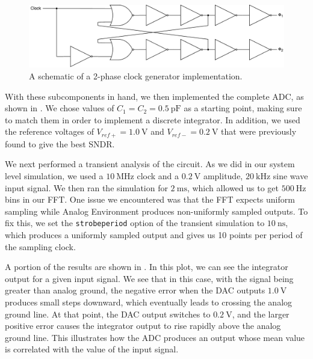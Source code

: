 \documentclass[journal,hidelinks]{IEEEtran}
\begin{document}
\begin{figure}[!htb]
  \centering
  \includegraphics[width=\columnwidth]{diagrams/clock.pdf}
  \caption{A schematic of a 2-phase clock generator implementation.}
  \label{fig:clock}
\end{figure}

With these subcomponents in hand, we then implemented the complete ADC, as shown in . We chose values of $C_1 = C_2 = \SI{0.5}{\pico\farad}$ as a starting point, making sure to match them in order to implement a discrete integrator. In addition, we used the reference voltages of $V_{ref+} = \SI{1.0}{\volt}$ and $V_{ref-} = \SI{0.2}{\volt}$ that were previously found to give the best SNDR.

We next performed a transient analysis of the circuit. As we did in our system level simulation, we used a $\SI{10}{\mega\hertz}$ clock and a $\SI{0.2}{\volt}$ amplitude, $\SI{20}{\kilo\hertz}$ sine wave input signal. We then ran the simulation for $\SI{2}{\milli\second}$, which allowed us to get $\SI{500}{\hertz}$ bins in our FFT. One issue we encountered was that the FFT expects uniform sampling while Analog Environment produces non-uniformly sampled outputs. To fix this, we set the \verb|strobeperiod| option of the transient simulation to $\SI{10}{\nano\second}$, which produces a uniformly sampled output and gives us 10 points per period of the sampling clock.

A portion of the results are shown in . In this plot, we can see the integrator output for a given input signal. We see that in this case, with the signal being greater than analog ground, the negative error when the DAC outputs $\SI{1.0}{\volt}$ produces small steps downward, which eventually leads to crossing the analog ground line. At that point, the DAC output switches to $\SI{0.2}{\volt}$, and the larger positive error causes the integrator output to rise rapidly above the analog ground line. This illustrates how the ADC produces an output whose mean value is correlated with the value of the input signal.
\end{document}
